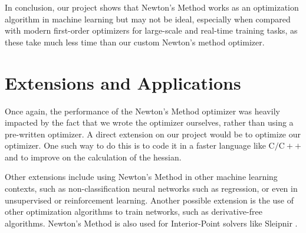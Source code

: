 \documentclass[10pt]{article}
\begin{document}
In conclusion, our project shows that Newton's Method works as an optimization algorithm in machine learning but may not be ideal, especially when compared with modern first-order optimizers for large-scale and real-time training tasks, as these take much less time than our custom Newton's method optimizer.

\section{Extensions and Applications}
Once again, the performance of the Newton's Method optimizer was heavily impacted by the fact that we wrote the optimizer ourselves, rather than using a pre-written optimizer. A direct extension on our project would be to optimize our optimizer. One such way to do this is to code it in a faster language like $\mathrm{C} / \mathrm{C}++$ and to improve on the calculation of the hessian.

Other extensions include using Newton's Method in other machine learning contexts, such as non-classification neural networks such as regression, or even in unsupervised or reinforcement learning. Another possible extension is the use of other optimization algorithms to train networks, such as derivative-free algorithms. Newton's Method is also used for Interior-Point solvers\cite{ipopt} like Sleipnir \cite{sleipnir}. 



\end{document}
